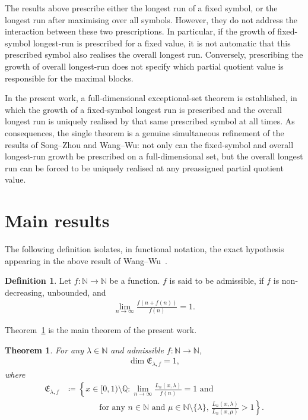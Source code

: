 \documentclass[12pt,reqno]{amsart}
\theoremstyle{definition}
\newtheorem{defi}{Definition}
\theoremstyle{plain}
\newtheorem{thm}{Theorem}
\begin{document}
The results above prescribe either the longest run of a fixed symbol, or the longest run after maximising over all symbols. However, they do not address the interaction between these two prescriptions. In particular, if the growth of fixed-symbol longest-run is prescribed for a fixed value, it is not automatic that this prescribed symbol also realises the overall longest run. Conversely, prescribing the growth of overall longest-run does not specify which partial quotient value is responsible for the maximal blocks.

In the present work, a full-dimensional exceptional-set theorem is established, in which the growth of a fixed-symbol longest run is prescribed and the overall longest run is uniquely realised by that same prescribed symbol at all times. As consequences, the single theorem is a genuine simultaneous refinement of the results of Song–Zhou and Wang–Wu: not only can the fixed-symbol and overall longest-run growth be prescribed on a full-dimensional set, but the overall longest run can be forced to be uniquely realised at any preassigned partial quotient value.

\section{Main results}

The following definition isolates, in functional notation, the exact hypothesis appearing in the above result of Wang--Wu~\cite[Theorem~1.3]{WangWu2011}.
\begin{defi}
Let $f:\mathbb{N}\to\mathbb{N}$ be a function. $f$ is said to be admissible, if $f$ is non-decreasing, unbounded, and
\begin{align*}
    \lim_{n\to\infty}\frac{f(n+f(n))}{f(n)}=1.
\end{align*}
\end{defi}

Theorem~\ref{thm:main-sn-final} is the main theorem of the present work.
\begin{thm}
\label{thm:main-sn-final}
For any $\lambda\in\mathbb{N}$ and admissible $f:\mathbb{N}\to\mathbb{N}$, 
\begin{align*}
    \dim{\mathfrak{E}_{\lambda,f}}=1,
\end{align*}
where
\begin{align*}
    \mathfrak{E}_{\lambda,f}
    &\coloneqq
    \left\{x\in[0,1)\setminus\mathbb{Q}:
    \lim_{n\to\infty}\frac{L_n(x,\lambda)}{f(n)}=1
    \text{ and }\right.\\
    &\qquad\qquad\left.\text{for any $n\in\mathbb{N}$ and $\mu\in\mathbb{N}\setminus\{\lambda\}$, }\frac{L_n(x,\lambda)}{L_n(x,\mu)}>1\right\}.
\end{align*}
\end{thm}
\end{document}
